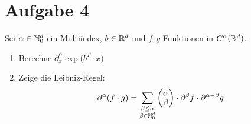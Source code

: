 \documentclass[12pt,a4paper]{article}
\begin{document}
\section*{Aufgabe 4}
Sei $\alpha\in\mathbb{N}_0^d$ ein Multiindex, $b\in\mathbb{R}^d$ und $f,g$ Funktionen in $C^\alpha(\mathbb{R}^d)$.
\begin{enumerate}[label=\alph*)]
\item Berechne $\partial_x^\alpha\exp\big(b^T\cdot x\big)$
\item Zeige die Leibniz-Regel:
\begin{align*}
\partial^\alpha(f\cdot g)=\sum\limits_{\begin{subarray}{c}\beta\leq\alpha\\\beta\in\mathbb{N}_0^d\end{subarray}}\begin{pmatrix}
\alpha\\\beta
\end{pmatrix}\cdot\partial^\beta f\cdot\partial^{\alpha-\beta}g
\end{align*}
\end{enumerate}
\end{document}
